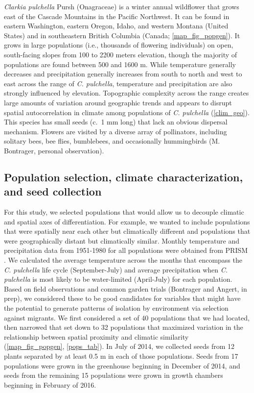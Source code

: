 \documentclass{article}
\begin{document}
\textit{Clarkia pulchella} Pursh (Onagraceae) is a winter annual wildflower that grows east of the Cascade Mountains in the Pacific Northwest. It can be found in eastern Washington, eastern Oregon, Idaho, and western Montana (United States) and in southeastern British Columbia (Canada; \autoref{map_fig_popgen}). It grows in large populations (i.e., thousands of flowering individuals) on open, south-facing slopes from 100 to 2200 meters elevation, though the majority of populations are found between 500 and 1600 m. While temperature generally decreases and precipitation generally increases from south to north and west to east across the range of \textit{C. pulchella}, temperature and precipitation are also strongly influenced by elevation. Topographic complexity across the range creates large amounts of variation around geographic trends and appears to disrupt spatial autocorrelation in climate among populations of \textit{C. pulchella} (\autoref{clim_geo}). This species has small seeds (c.\ 1 mm long) that lack an obvious dispersal mechanism. Flowers are visited by a diverse array of pollinators, including solitary bees, bee flies, bumblebees, and occasionally hummingbirds (M. Bontrager, personal observation).

\subsection*{Population selection, climate characterization, and seed collection}
For this study, we selected populations that would allow us to decouple climatic and spatial axes of differentiation. For example, we wanted to include populations that were spatially near each other but climatically different and populations that were geographically distant but climatically similar. Monthly temperature and precipitation data from 1951-1980 for all populations were obtained from PRISM \citep{PRISM}. We calculated the average temperature across the months that encompass the \textit{C. pulchella} life cycle (September-July) and average precipitation when \textit{C. pulchella} is most likely to be water-limited (April-July) for each population. Based on field observations and common garden trials (Bontrager and Angert, in prep), we considered these to be good candidates for variables that might have the potential to generate patterns of isolation by environment via selection against migrants. We first considered a set of 40 populations that we had located, then narrowed that set down to 32 populations that maximized variation in the relationship between spatial proximity and climatic similarity (\autoref{map_fig_popgen}, \autoref{pops_tab}). In July of 2014, we collected seeds from 12 plants separated by at least 0.5 m in each of those populations. Seeds from 17 populations were grown in the greenhouse beginning in December of 2014, and seeds from the remaining 15 populations were grown in growth chambers beginning in February of 2016. 
\end{document}
